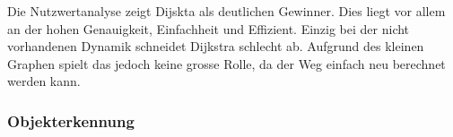 \begin{table}[H]
    \caption{Nutzwertanalyse Wegfindung}
    \label{tab:nutzwertanalyse_wegfindung}
\end{table}

Die Nutzwertanalyse zeigt Dijskta als deutlichen Gewinner. Dies liegt vor allem an der hohen Genauigkeit, Einfachheit und Effizient. Einzig bei der nicht vorhandenen Dynamik schneidet Dijkstra schlecht ab. Aufgrund des kleinen Graphen spielt das jedoch keine grosse Rolle, da der Weg einfach neu berechnet werden kann.


\newpage
\subsubsection{Objekterkennung}

